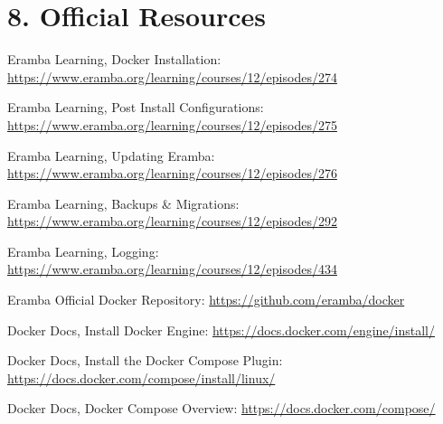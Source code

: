 \documentclass[10pt,letterpaper]{article}
\begin{document}
\section{8. Official Resources}
\begin{enumerate}[label={[\arabic*]}, leftmargin=*]
  \item Eramba Learning, Docker Installation: \url{https://www.eramba.org/learning/courses/12/episodes/274}
  \item Eramba Learning, Post Install Configurations: \url{https://www.eramba.org/learning/courses/12/episodes/275}
  \item Eramba Learning, Updating Eramba: \url{https://www.eramba.org/learning/courses/12/episodes/276}
  \item Eramba Learning, Backups \& Migrations: \url{https://www.eramba.org/learning/courses/12/episodes/292}
  \item Eramba Learning, Logging: \url{https://www.eramba.org/learning/courses/12/episodes/434}
  \item Eramba Official Docker Repository: \url{https://github.com/eramba/docker}
  \item Docker Docs, Install Docker Engine: \url{https://docs.docker.com/engine/install/}
  \item Docker Docs, Install the Docker Compose Plugin: \url{https://docs.docker.com/compose/install/linux/}
  \item Docker Docs, Docker Compose Overview: \url{https://docs.docker.com/compose/}
\end{enumerate}
\end{document}
